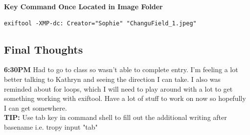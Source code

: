 \documentclass{article}
\begin{document}
\textbf{Key Command Once Located in Image Folder}
\begin{verbatim}
exiftool -XMP-dc: Creator="Sophie" "ChanguField_1.jpeg"
\end{verbatim}

\subsection{Final Thoughts}
\textbf{6:30PM} Had to go to class so wasn't able to complete entry. I'm feeling a lot better talking to Kathryn and seeing the direction I can take. I also was reminded about for loops, which I will need to play around with a lot to get something working with exiftool. Have a lot of stuff to work on now so hopefully I can get somewhere.  \\
\textbf{TIP:} Use tab key in command shell to fill out the additional writing after basename i.e. tropy input "tab"
\end{document}
